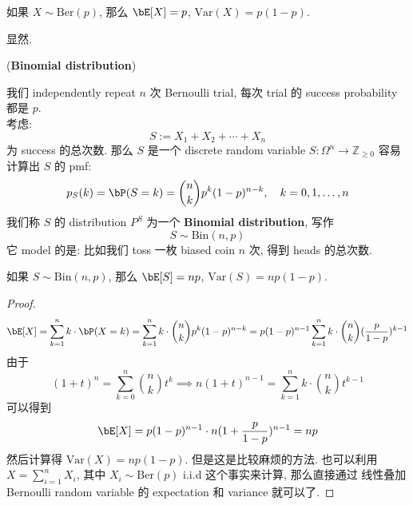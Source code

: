 \begin{proposition}
    如果 \(X \sim \text{Ber}(p)\), 
    那么 \(\bE[X] = p\), \(\text{Var}(X) = p(1-p)\).
\end{proposition}
显然.

\begin{example}{(\textbf{Binomial distribution})}

我们 independently repeat \(n\) 次 Bernoulli trial, 
每次 trial 的 success probability 都是 \(p\).\\
考虑:
\[
S := X_1 + X_2 + \cdots + X_n
\] 为 success 的总次数. 那么 \(S\) 是一个 discrete random variable 
\( S: \Omega^n \to \mathbb{Z}_{\geq 0}  \)
容易计算出 \(S\) 的 pmf:
\[
p_S(k) = \bP(S = k) = \binom{n}{k} p^k (1-p)^{n-k}, \quad k = 0,1,\ldots,n
\]
我们称 \(S\) 的 distribution \(P^S\) 为一个 \textbf{Binomial distribution}, 写作
\[
S \sim \text{Bin}(n,p)
\]
它 model 的是: 比如我们 toss 一枚 biased coin \(n\) 次,
得到 heads 的总次数.\\
\end{example}
\begin{proposition}
    如果 \(S \sim \text{Bin}(n,p)\), 那么 \(\bE[S] = np\), \(\text{Var}(S) = np(1-p)\).
\end{proposition}
\begin{proof}
    \[
    \bE[X] = \sum_{k=1}^n k \cdot \bP(X = k) = 
    \sum_{k=1}^n k \cdot \binom{n}{k} p^k (1-p)^{n-k} =
    p(1-p)^{n-1} \sum_{k=1}^n k \cdot \binom{n}{k} (\frac{p}{1-p})^{k-1}
    \]
    由于 \[
    (1+t)^n = \sum_{k=0}^{n} \binom{n}{k} t^k \implies n(1+t)^{n-1} = \sum_{k=1}^n k \cdot \binom{n}{k} t^{k-1}
    \]
    可以得到 \[
    \bE[X] = p(1-p)^{n-1} \cdot n(1+\frac{p}{1-p})^{n-1} = np
    \]
    然后计算得
    \(
    \text{Var}(X) = np(1-p)
    \). 但是这是比较麻烦的方法. 
    也可以利用 \(X = \sum_{i=1}^n X_i\), 
    其中 \(X_i \sim \text{Ber}(p)\) i.i.d 这个事实来计算, 那么直接通过
    线性叠加 Bernoulli random variable 的 expectation 和 variance 就可以了.
\end{proof}

